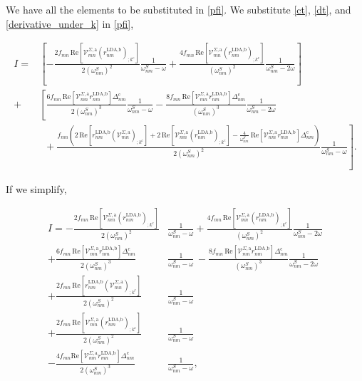 We have all the elements to be substituted in \eqref{pfi}. We substitute \eqref{ct}, \eqref{dt}, and \eqref{derivative_under_k} in \eqref{pfi},

\begin{align*}
I
= &\left[-\frac{2f_{mn}\,\mathrm{Re}\left[\mathcal{V}^{\Sigma,\text{a}}_{mn}\left(r^{\text{LDA,b}}_{nm}\right)_{;k^{\text{c}}}\right]}{2(\omega^{S}_{nm})^{2}}\frac{1}{\omega^{S}_{nm}-\omega} + \frac{4f_{mn}\,\mathrm{Re}\left[\mathcal{V}^{\Sigma,\text{a}}_{mn}\left(r^{\text{LDA,b}}_{nm}\right)_{;k^{\text{c}}}\right]}{(\omega^{S}_{nm})^{2}}\frac{1}{\omega^{S}_{nm}-2\omega}\right]\nonumber\\
+ &\left[\frac{6f_{mn}\,\mathrm{Re}\left[\mathcal{V}^{\Sigma,\text{a}}_{mn}r^{\text{LDA,b}}_{nm}\right]\Delta^{\text{c}}_{nm}}{2(\omega^{S}_{nm})^{3}}\frac{1}{\omega^{S}_{nm}-\omega} 
- \frac{8f_{mn}\,\mathrm{Re}\left[\mathcal{V}^{\Sigma,\text{a}}_{mn}r^{\text{LDA,b}}_{nm}\right]\Delta^{\text{c}}_{nm}}{(\omega^{S}_{nm})^{3}}\frac{1}{\omega^{S}_{nm}-2\omega}\right.\nonumber\\
&\,\,\,+ \left.\frac{f_{mn}\left(2\,\mathrm{Re}\left[r^{\text{LDA,b}}_{nm}\left(\mathcal{V}^{\Sigma,\text{a}}_{mn}\right)_{;k^{\text{c}}}\right] + 2\,\mathrm{Re}\left[\mathcal{V}^{\Sigma,\text{a}}_{mn}\left(r^{\text{LDA,b}}_{nm}\right)_{;k^{\text{c}}}\right] - \frac{4}{\omega^{S}_{nm}}\,\mathrm{Re}\left[\mathcal{V}^{\Sigma,\text{a}}_{nm}r^{\text{LDA,b}}_{mn}\right]\Delta_{nm}^{\text{c}}\right)}{2(\omega^{S}_{nm})^{2}}\frac{1}{\omega^S_{nm}-\omega}\right].
\end{align*}

If we simplify,

\begin{align}\label{simplified_i} 
I =
-\frac{2f_{mn}\,\mathrm{Re}\left[\mathcal{V}^{\Sigma,\text{a}}_{mn}\left(r^{\text{LDA,b}}_{nm}\right)_{;k^{\text{c}}}\right]}{2(\omega^{S}_{nm})^{2}}&\frac{1}{\omega^{S}_{nm}-\omega}
+ \frac{4f_{mn}\,\mathrm{Re}\left[\mathcal{V}^{\Sigma,\text{a}}_{mn}\left(r^{\text{LDA,b}}_{nm}\right)_{;k^{\text{c}}}\right]}{(\omega^{S}_{nm})^{2}}\frac{1}{\omega^{S}_{nm}-2\omega}\nonumber\\
+ \frac{6f_{mn}\,\mathrm{Re}\left[\mathcal{V}^{\Sigma,\text{a}}_{mn}r^{\text{LDA,b}}_{nm}\right]\Delta^{\text{c}}_{nm}}{2(\omega^{S}_{nm})^{3}}&\frac{1}{\omega^{S}_{nm}-\omega} 
\,- \frac{8f_{mn}\,\mathrm{Re}\left[\mathcal{V}^{\Sigma,\text{a}}_{mn}r^{\text{LDA,b}}_{nm}\right]\Delta^{\text{c}}_{nm}}{(\omega^{S}_{nm})^{3}}\frac{1}{\omega^{S}_{nm}-2\omega}\nonumber\\
+ \frac{2f_{mn}\,\mathrm{Re}\left[r^{\text{LDA,b}}_{nm}\left(\mathcal{V}^{\Sigma,\text{a}}_{mn}\right)_{;k^{\text{c}}}\right]}{2(\omega^{S}_{nm})^{2}}&\frac{1}{\omega^{S}_{nm}-\omega}\nonumber\\
+ \frac{2f_{mn}\,\mathrm{Re}\left[\mathcal{V}^{\Sigma,\text{a}}_{mn}\left(r^{\text{LDA,b}}_{nm}\right)_{;k^{\text{c}}}\right]}{2(\omega^{S}_{nm})^{2}}&\frac{1}{\omega^{S}_{nm}-\omega}\nonumber\\
- \frac{4f_{mn}\mathrm{Re}\left[\mathcal{V}^{\Sigma,\text{a}}_{nm}r^{\text{LDA,b}}_{mn}\right]\Delta_{nm}^{\text{c}}}{2(\omega^{S}_{nm})^{3}}&\frac{1}{\omega^{S}_{nm}-\omega},
\end{align}

